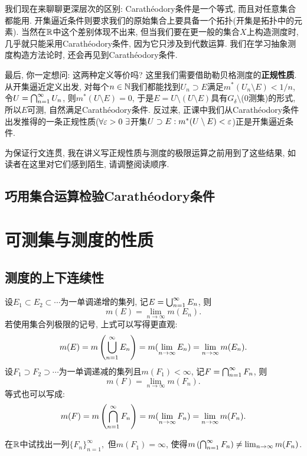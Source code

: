 我们现在来聊聊更深层次的区别: 
Carath\'eodory条件是一个等式, 而且对任意集合都能用. 开集逼近条件则要求我们的原始集合上要具备一个拓扑(开集是拓扑中的元素). 当然在$\mathbb{R}$中这个差别体现不出来, 但当我们要在更一般的集合$X$上构造测度时, 几乎就只能采用Carath\'eodory条件, 因为它只涉及到代数运算. 我们在学习抽象测度构造方法论时, 还会再见到Carath\'eodory条件. 

最后, 你一定想问: 这两种定义等价吗? 这里我们需要借助勒贝格测度的\textbf{正规性质}. 从开集逼近定义出发, 对每个$n \in \mathbb{N}$我们都能找到$U_n \supset E$满足$m^*(U_n \setminus E) < 1/n$, 令$U = \bigcap_{n=1}^{\infty}U_n$, 则$m^*(U \setminus E) = 0$, 于是$E = U \setminus (U \setminus E)$具有$G_\delta \setminus$(0测集)的形式, 所以$E$可测, 自然满足Carath\'eodory条件. 反过来, 正课中我们从Carath\'eodory条件出发推得的一条正规性质($\forall \varepsilon>0~\exists$开集$U \supset E: m^*(U \setminus E)<\varepsilon$)正是开集逼近条件.

\begin{remark}
    为保证行文连贯, 我在讲义写正规性质与测度的极限运算之前用到了这些结果, 如读者在这里对它们感到陌生, 请调整阅读顺序. 
\end{remark}




\subsection{巧用集合运算检验Carath\'eodory条件}




\section{可测集与测度的性质}
\subsection{测度的上下连续性}
设$E_1 \subset E_2 \subset \cdots $为一单调递增的集列, 记$E = \bigcup_{n=1}^{\infty}E_n$, 则
$$m(E)=\lim_{n \to \infty}m(E_n).$$
若使用集合列极限的记号, 上式可以写得更直观:
$$m(E)=m\left(\bigcup_{n=1}^{\infty}E_n\right)=m(\lim_{n \to \infty}E_n) = \lim_{n \to \infty}m(E_n).$$
设$F_1 \supset F_2 \supset \cdots $为一单调递减的集列且$m(F_1)<\infty$,
记$F = \bigcap_{n=1}^{\infty}F_n$, 则
$$m(F)=\lim_{n \to \infty}m(F_n).$$
等式也可以写成:
$$m(F)=m\left(\bigcap_{n=1}^{\infty}F_n\right)=m(\lim_{n \to \infty}F_n) = \lim_{n \to \infty}m(F_n).$$
\begin{exercise}
    在$\mathbb{R}$中试找出一列$\{F_n\}_{n=1}^\infty,$ 但$m(F_1)=\infty$, 
    使得$m\left(\bigcap_{n=1}^{\infty}F_n\right) \neq \lim_{n \to \infty}m(F_n)$.
\end{exercise}

